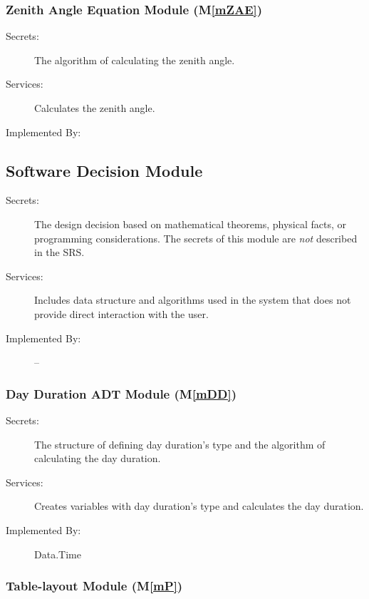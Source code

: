 \documentclass[12pt, titlepage]{article}
\newcommand{\mref}[1]{M\ref{#1}}
\begin{document}
\subsubsection{Zenith Angle Equation Module (\mref{mZAE})}

\begin{description}
\item[Secrets:]The algorithm of calculating the zenith angle.
\item[Services:] Calculates the zenith angle.
\item[Implemented By:] \progname

\end{description}


\subsection{Software Decision Module}

\begin{description}
\item[Secrets:] The design decision based on mathematical theorems, physical
  facts, or programming considerations. The secrets of this module are
  \emph{not} described in the SRS.
\item[Services:] Includes data structure and algorithms used in the system that
  does not provide direct interaction with the user. 
\item[Implemented By:] --
\end{description}


\subsubsection{Day Duration ADT Module (\mref{mDD})}

\begin{description}
\item[Secrets:] The structure of defining day duration's type and the algorithm of calculating the day duration.
\item[Services:] Creates variables with day duration's type and calculates the day duration.
\item[Implemented By:] Data.Time
\end{description}

\subsubsection{Table-layout Module (\mref{mP})}
\end{document}
